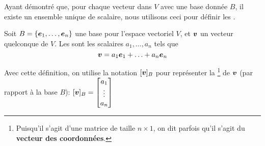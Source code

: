 Ayant démontré que, pour chaque vecteur dans $V$ avec une base donnée $B$,
il existe un ensemble unique de scalaire, nous utilisons ceci pour définir
les .

\begin{defini}
Soit $B = \{\boldsymbol{e}_1, \ldots, \boldsymbol{e}_n\}$ une base pour l'espace vectoriel $V$, 
et $\boldsymbol{v}$ un vecteur quelconque de $V$.
Les  sont les scalaires
$a_1, \ldots, a_n$ tels que
\[
\boldsymbol{v} = a_1 \boldsymbol{e}_1 + \ldots + a_n \boldsymbol{e}_n
\]
\end{defini}

Avec cette définition, on utilise la notation $[\boldsymbol{v}]_B$ pour représenter la
\footnote{Puisqu'il s'agit d'une matrice de taille $n\times 1$,
on dit parfois qu'il s'agit du \textbf{vecteur des coordonnées}.} de $\boldsymbol{v}$ (par rapport à la base $B$):
$\displaystyle
[\boldsymbol{v}]_B = \begin{bmatrix}
a_1 \\
\vdots \\
a_n
\end{bmatrix}
$

